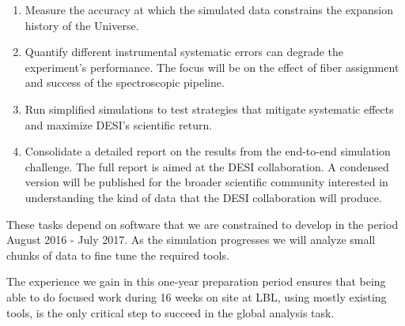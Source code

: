 \documentclass[12pt]{article}
\begin{document}
\begin{enumerate}
\item Measure the accuracy at which the simulated data constrains the
  expansion history of the Universe.  
\item Quantify different instrumental systematic errors can degrade
  the experiment's performance. The focus will be on the effect of
  fiber assignment and success of the spectroscopic pipeline. 
\item Run simplified simulations to test strategies that mitigate
  systematic effects and maximize DESI's scientific return.
\item Consolidate a detailed report on the results from the end-to-end
  simulation challenge. 
  The full report is aimed at the DESI collaboration. A condensed
  version will be published for the broader scientific community
  interested in understanding the kind of data that the DESI
  collaboration will produce. 
\end{enumerate}

These tasks depend on software that we are constrained to develop in
the period August 2016 - July 2017. As the simulation progresses we
will analyze small chunks of data to fine tune the required tools.  

The experience we gain in this one-year preparation period ensures that
being able to do focused work during 16 weeks on site at LBL, using
mostly existing tools, is the only critical step to succeed in the
global analysis task. 

\newpage


%
{}
\end{document}
